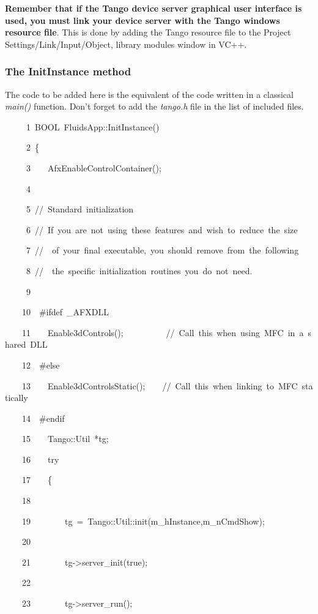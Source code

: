 \textbf{Remember that if the Tango device server graphical user interface
is used, you must link your device server with the Tango windows resource
file}. This is done by adding the Tango resource file to the Project
Settings/Link/Input/Object, library modules window in VC++.

\subsubsection{The InitInstance method}

The code to be added here is the equivalent of the code written in
a classical \emph{main()} function. Don't forget to add the \emph{tango.h}
file in the list of included files.


\begin{lyxcode}
~~~~~1~BOOL~FluidsApp::InitInstance()

~~~~~2~\{

~~~~~3~~~~AfxEnableControlContainer();

~~~~~4~~

~~~~~5~//~Standard~initialization

~~~~~6~//~If~you~are~not~using~these~features~and~wish~to~reduce~the~size

~~~~~7~//~~of~your~final~executable,~you~should~remove~from~the~following

~~~~~8~//~~the~specific~initialization~routines~you~do~not~need.

~~~~~9~~

~~~~10~~\#ifdef~\_AFXDLL

~~~~11~~~~Enable3dControls();~~~~~~~~~~//~Call~this~when~using~MFC~in~a~shared~DLL

~~~~12~~\#else

~~~~13~~~~Enable3dControlsStatic();~~~~//~Call~this~when~linking~to~MFC~statically

~~~~14~~\#endif

~~~~15~~~~Tango::Util~{*}tg;

~~~~16~~~~try

~~~~17~~~~\{

~~~~18~~~~~~~~~~

~~~~19~~~~~~~~tg~=~Tango::Util::init(m\_hInstance,m\_nCmdShow);

~~~~20~~

~~~~21~~~~~~~~tg->server\_init(true);

~~~~22~~

~~~~23~~~~~~~~tg->server\_run();


\end{lyxcode}

